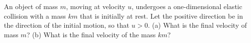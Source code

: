 An object of mass $m$, moving at velocity $u$,
undergoes a one-dimensional elastic collision with a mass
$km$ that is initially at rest. Let the positive direction be
in the direction of the initial motion, so that $u>0$.
%
(a) What is the final velocity of mass $m$?\answercheck\hwendpart
%
(b) What is the final velocity of the mass $km$?\answercheck
